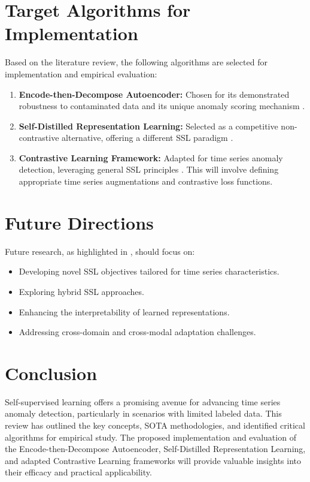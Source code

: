 \documentclass{article}
\begin{document}
\section{Target Algorithms for Implementation}
Based on the literature review, the following algorithms are selected for implementation and empirical evaluation:

\begin{enumerate}
    \item \textbf{Encode-then-Decompose Autoencoder:} Chosen for its demonstrated robustness to contaminated data and its unique anomaly scoring mechanism \cite{encode_decompose}.
    \item \textbf{Self-Distilled Representation Learning:} Selected as a competitive non-contrastive alternative, offering a different SSL paradigm \cite{self_distilled}.
    \item \textbf{Contrastive Learning Framework:} Adapted for time series anomaly detection, leveraging general SSL principles \cite{survey_paper}. This will involve defining appropriate time series augmentations and contrastive loss functions.
\end{enumerate}

\section{Future Directions}
Future research, as highlighted in \cite{survey_paper}, should focus on:
\begin{itemize}
    \item Developing novel SSL objectives tailored for time series characteristics.
    \item Exploring hybrid SSL approaches.
    \item Enhancing the interpretability of learned representations.
    \item Addressing cross-domain and cross-modal adaptation challenges.
\end{itemize}

\section{Conclusion}
Self-supervised learning offers a promising avenue for advancing time series anomaly detection, particularly in scenarios with limited labeled data. This review has outlined the key concepts, SOTA methodologies, and identified critical algorithms for empirical study. The proposed implementation and evaluation of the Encode-then-Decompose Autoencoder, Self-Distilled Representation Learning, and adapted Contrastive Learning frameworks will provide valuable insights into their efficacy and practical applicability.
\end{document}
